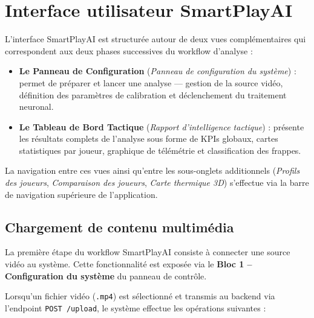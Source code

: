 \section{Interface utilisateur SmartPlayAI}
 
L'interface SmartPlayAI est structurée autour de deux vues complémentaires qui correspondent
aux deux phases successives du workflow d'analyse :
 
\begin{itemize}[leftmargin=1.5em]
  \item \textbf{Le Panneau de Configuration} (\textit{Panneau de configuration du système}) : permet
        de préparer et lancer une analyse — gestion de la source vidéo, définition des
        paramètres de calibration et déclenchement du traitement neuronal.

  \item \textbf{Le Tableau de Bord Tactique} (\textit{Rapport d'intelligence tactique}) :
        présente les résultats complets de l'analyse sous forme de KPIs globaux, cartes
        statistiques par joueur, graphique de télémétrie et classification des frappes.
\end{itemize}
 
La navigation entre ces vues ainsi qu'entre les sous-onglets additionnels (\textit{Profils des joueurs}, \textit{Comparaison des joueurs}, \textit{Carte thermique 3D}) s'effectue via la barre de
navigation supérieure de l'application.
 
\subsection{Chargement de contenu multimédia}
 
La première étape du workflow SmartPlayAI consiste à connecter une source vidéo au système.
Cette fonctionnalité est exposée via le \textbf{Bloc 1 – Configuration du système} du panneau de
contrôle.
 
Lorsqu'un fichier vidéo (\texttt{.mp4}) est sélectionné et transmis au backend via l'endpoint
\texttt{POST /upload}, le système effectue les opérations suivantes :
 
